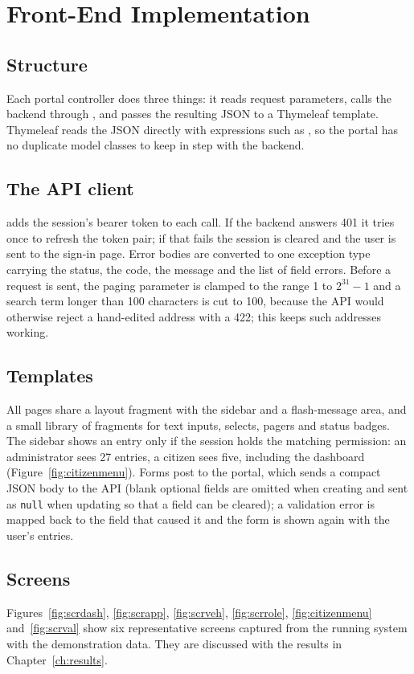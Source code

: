 \section{Front-End Implementation}
\subsection{Structure}
Each portal controller does three things: it reads request parameters, calls the backend
through , and passes the resulting JSON to a Thymeleaf template. Thymeleaf
reads the JSON directly with expressions such as , so the
portal has no duplicate model classes to keep in step with the backend.

\subsection{The API client}
 adds the session's bearer token to each call. If the backend answers 401 it
tries once to refresh the token pair; if that fails the session is cleared and the user is
sent to the sign-in page. Error bodies are converted to one exception type carrying the
status, the code, the message and the list of field errors. Before a request is sent, the
paging parameter is clamped to the range 1 to $2^{31}-1$ and a search term longer than 100
characters is cut to 100, because the API would otherwise reject a hand-edited address
with a 422; this keeps such addresses working.

\subsection{Templates}
All pages share a layout fragment with the sidebar and a flash-message area, and a small
library of fragments for text inputs, selects, pagers and status badges. The sidebar shows an
entry only if the session holds the matching permission: an administrator sees 27 entries,
a citizen sees five, including the dashboard (Figure~\ref{fig:citizenmenu}). Forms post to the portal, which sends a
compact JSON body to the API (blank optional fields are omitted when creating and sent as
\texttt{null} when updating so that a field can be cleared); a validation error is mapped back
to the field that caused it and the form is shown again with the user's entries.

\subsection{Screens}
Figures~\ref{fig:scrdash}, \ref{fig:scrapp}, \ref{fig:scrveh}, \ref{fig:scrrole},
\ref{fig:citizenmenu} and~\ref{fig:scrval} show six representative screens captured from
the running system with the demonstration data. They are discussed with the results in
Chapter~\ref{ch:results}.

